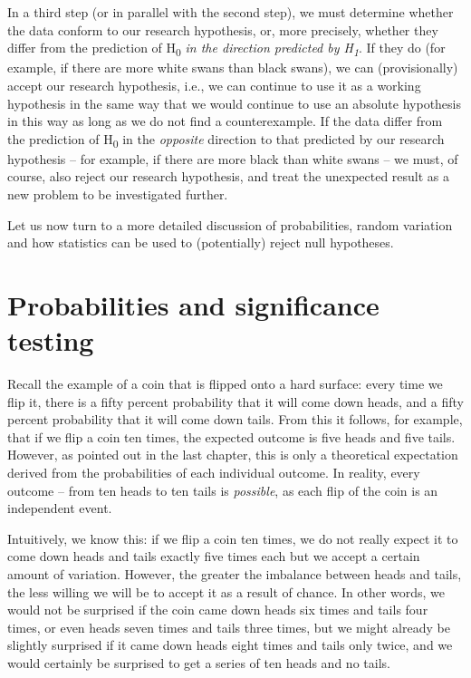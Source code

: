 In a third step (or in parallel with the second step), we must determine whether the data conform to our research hypothesis, or, more precisely, whether they differ from the prediction of H\textsubscript{0} \textit{in the direction predicted by H\textsubscript{1}}. If they do (for example, if there are more white swans than black swans), we can (provisionally) accept our research hypothesis, i.e., we can continue to use it as a working hypothesis in the same way that we would continue to use an absolute hypothesis in this way as long as we do not find a counterexample.  If the data differ from the prediction of H\textsubscript{0} in the \textit{opposite} direction to that predicted by our research hypothesis -- for example, if there are more black than white swans -- we must, of course, also reject our research hypothesis, and treat the unexpected result as a new problem to be investigated further.

Let us now turn to a more detailed discussion of probabilities,  random  variation  and how statistics  can be used to (potentially) reject null  hypotheses.

\section{Probabilities and significance testing}
\label{sec:probabilitysignificance}

Recall the example of a coin that is flipped onto a hard surface: every time we flip it, there is a fifty percent probability  that it will come down heads, and a fifty percent probability that it will come down tails. From this it follows, for example, that if we flip a coin ten times, the expected  outcome is five heads and five tails. However, as pointed out in the last chapter, this is only a theoretical expectation derived from the probabilities of each individual outcome. In reality, every outcome -- from ten heads to ten tails is \textit{possible}, as each flip of the coin is an independent  event.

Intuitively, we know this: if we flip a coin ten times, we do not really expect it to come down heads and tails exactly five times each but we accept a certain amount of variation.  However, the greater the imbalance between heads and tails, the less willing we will be to accept it as a result of chance.  In other words, we would not be surprised if the coin came down heads six times and tails four times, or even heads seven times and tails three times, but we might already be slightly surprised if it came down heads eight times and tails only twice, and we would certainly be surprised to get a series of ten heads and no tails.

